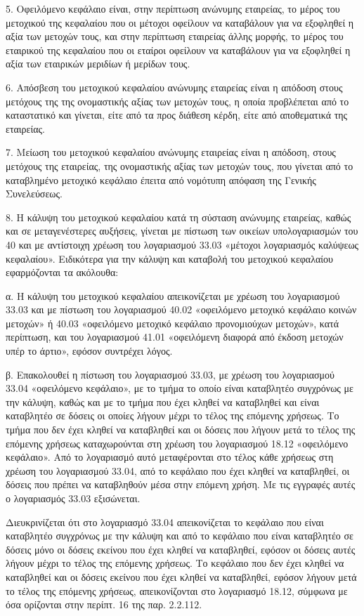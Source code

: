 \documentclass[A4,10pt,greek]{book}
\begin{document}
5. Οφειλόμενο κεφάλαιο είναι, στην περίπτωση ανώνυμης εταιρείας, το μέρος του μετοχικού της κεφαλαίου που οι μέτοχοι οφείλουν να καταβάλουν για να εξοφληθεί η αξία των μετοχών τους, και στην περίπτωση εταιρείας άλλης μορφής, το μέρος του εταιρικού της κεφαλαίου που οι εταίροι οφείλουν να καταβάλουν για να εξοφληθεί η αξία των εταιρικών μεριδίων ή μερίδων τους.

6. Απόσβεση του μετοχικού κεφαλαίου ανώνυμης εταιρείας είναι η απόδοση στους μετόχους της της ονομαστικής αξίας των μετοχών τους, η οποία προβλέπεται από το καταστατικό και γίνεται, είτε από τα προς διάθεση κέρδη, είτε από αποθεματικά της εταιρείας.

7. Μείωση του μετοχικού κεφαλαίου ανώνυμης εταιρείας είναι η απόδοση, στους μετόχους της εταιρείας, της ονομαστικής αξίας των μετοχών τους, που γίνεται από το καταβλημένο μετοχικό κεφάλαιο έπειτα από νομότυπη απόφαση της Γενικής Συνελεύσεως.

8. Η κάλυψη του μετοχικού κεφαλαίου κατά τη σύσταση ανώνυμης εταιρείας, καθώς και σε μεταγενέστερες αυξήσεις, γίνεται με πίστωση των οικείων υπολογαριασμών του 40 και με αντίστοιχη χρέωση του λογαριασμού 33.03 «μέτοχοι λογαριασμός καλύψεως κεφαλαίου». Ειδικότερα για την κάλυψη και καταβολή του μετοχικού κεφαλαίου εφαρμόζονται τα ακόλουθα:

α. Η κάλυψη του μετοχικού κεφαλαίου απεικονίζεται με χρέωση του λογαριασμού 33.03 και με πίστωση του λογαριασμού 40.02 «οφειλόμενο μετοχικό κεφάλαιο κοινών μετοχών» ή 40.03 «οφειλόμενο μετοχικό κεφάλαιο προνομιούχων μετοχών», κατά περίπτωση, και του λογαριασμού 41.01 «οφειλόμενη διαφορά από έκδοση μετοχών υπέρ το άρτιο», εφόσον συντρέχει λόγος.

β. Επακολουθεί η πίστωση του λογαριασμού 33.03, με χρέωση του λογαριασμού 33.04 «οφειλόμενο κεφάλαιο», με το τμήμα το οποίο είναι καταβλητέο συγχρόνως με την κάλυψη, καθώς και με το τμήμα που έχει κληθεί να καταβληθεί και είναι καταβλητέο σε δόσεις οι οποίες λήγουν μέχρι το τέλος της επόμενης χρήσεως. Το τμήμα που δεν έχει κληθεί να καταβληθεί και οι δόσεις που λήγουν μετά το τέλος της επόμενης χρήσεως καταχωρούνται στη χρέωση του λογαριασμού 18.12 «οφειλόμενο κεφάλαιο». Από το λογαριασμό αυτό μεταφέρονται στο τέλος κάθε χρήσεως στη χρέωση του λογαριασμού 33.04, από το κεφάλαιο που έχει κληθεί να καταβληθεί, οι δόσεις που πρέπει να καταβληθούν μέσα στην επόμενη χρήση. Με τις εγγραφές αυτές ο λογαριασμός 33.03 εξισώνεται.

Διευκρινίζεται ότι στο λογαριασμό 33.04 απεικονίζεται το κεφάλαιο που είναι καταβλητέο συγχρόνως με την κάλυψη και από το κεφάλαιο που είναι καταβλητέο σε δόσεις μόνο οι δόσεις εκείνου που έχει κληθεί να καταβληθεί, εφόσον οι δόσεις αυτές λήγουν μέχρι το τέλος της επόμενης χρήσεως. Το κεφάλαιο που δεν έχει κληθεί να καταβληθεί και οι δόσεις εκείνου που έχει κληθεί να καταβληθεί, εφόσον λήγουν μετά το τέλος της επόμενης χρήσεως, απεικονίζονται στο λογαριασμό 18.12, σύμφωνα με όσα ορίζονται στην περίπτ. 16 της παρ. 2.2.112.
\end{document}

